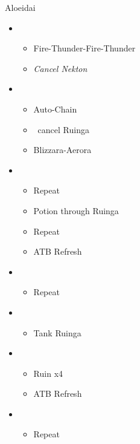 \begin{battle}{Aloeidai}
\begin{flushleft}
\begin{itemize}
	\begin{itemize}
		\item \third
		\begin{itemize}
			\item Fire-Thunder-Fire-Thunder
			\item \textit{Cancel Nekton}
		\end{itemize}
		\item \fifth
		\begin{itemize}
			\item Auto-Chain
			\item \stagger\ cancel Ruinga
			\item Blizzara-Aerora
		\end{itemize}
		\item \sixth
		\begin{itemize}
			\item Repeat
			\item Potion through Ruinga
			\item Repeat
			\item ATB Refresh
		\end{itemize}
		\item \fifth
		\begin{itemize}
			\item Repeat
		\end{itemize}
		\item \fourth
		\begin{itemize}
			\item Tank Ruinga
		\end{itemize}
		\item \second
		\begin{itemize}
			\item Ruin x4
			\item ATB Refresh
		\end{itemize}
		\item \first
		\begin{itemize}	
			\item Repeat
		\end{itemize}
	\end{itemize}
\end{itemize}
\end{flushleft}
\end{battle}




